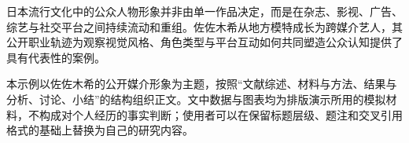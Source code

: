 日本流行文化中的公众人物形象并非由单一作品决定，而是在杂志、影视、广告、综艺与社交平台之间持续流动和重组。佐佐木希从地方模特成长为跨媒介艺人，其公开职业轨迹为观察视觉风格、角色类型与平台互动如何共同塑造公众认知提供了具有代表性的案例。

本示例以佐佐木希的公开媒介形象为主题，按照“文献综述、材料与方法、结果与分析、讨论、小结”的结构组织正文。文中数据与图表均为排版演示所用的模拟材料，不构成对个人经历的事实判断；使用者可以在保留标题层级、题注和交叉引用格式的基础上替换为自己的研究内容。
